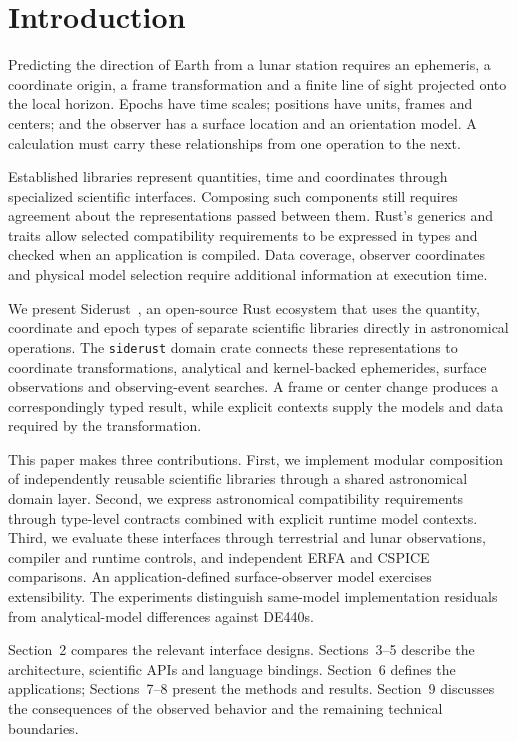 \section{Introduction}

Predicting the direction of Earth from a lunar station requires an ephemeris, a coordinate origin,
a frame transformation and a finite line of sight projected onto the local horizon. Epochs have
time scales; positions have units, frames and centers; and the observer has a surface location and
an orientation model. A calculation must carry these relationships from one operation to the next.

Established libraries represent quantities, time and coordinates through specialized scientific
interfaces. Composing such components still requires agreement about the representations passed
between them. Rust's generics and traits allow selected compatibility requirements to be expressed
in types and checked when an application is compiled. Data coverage, observer coordinates and
physical model selection require additional information at execution time.

We present Siderust~\cite{Valles_Puig_Siderust_Type-Safe_Astronomy}, an open-source Rust ecosystem
that uses the quantity, coordinate and epoch types of separate scientific libraries directly in
astronomical operations. The \texttt{siderust} domain crate connects these representations to
coordinate transformations, analytical and kernel-backed ephemerides, surface observations and
observing-event searches. A frame or center change produces a correspondingly typed result, while
explicit contexts supply the models and data required by the transformation.

This paper makes three contributions. First, we implement modular composition of independently
reusable scientific libraries through a shared astronomical domain layer. Second, we express
astronomical compatibility requirements through type-level contracts combined with explicit runtime
model contexts. Third, we evaluate these interfaces through terrestrial and lunar observations,
compiler and runtime controls, and independent ERFA and CSPICE comparisons. An application-defined
surface-observer model exercises extensibility. The experiments distinguish same-model
implementation residuals from analytical-model differences against DE440s.

Section~2 compares the relevant interface designs. Sections~3--5 describe the architecture,
scientific APIs and language bindings. Section~6 defines the applications; Sections~7--8 present
the methods and results. Section~9 discusses the consequences of the observed behavior and the
remaining technical boundaries.
